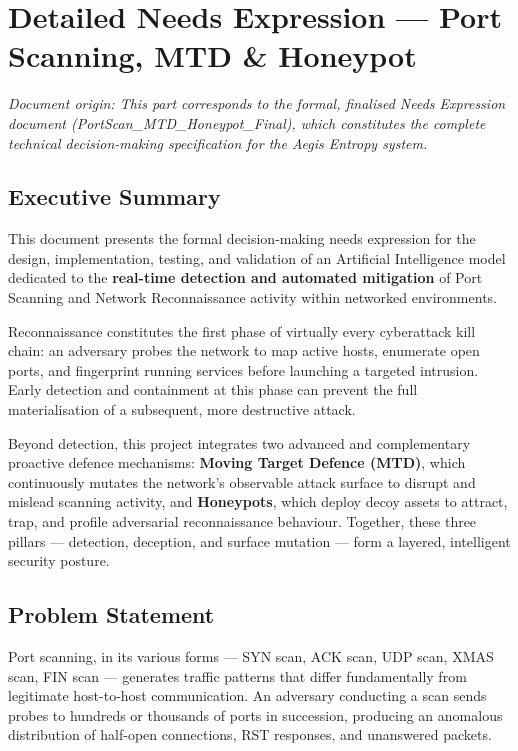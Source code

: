 \documentclass[12pt,a4paper]{report}
\begin{document}
\part{Detailed Needs Expression --- Port Scanning, MTD \& Honeypot}

\textit{Document origin: This part corresponds to the formal, finalised Needs Expression
document (PortScan\_MTD\_Honeypot\_Final), which constitutes the complete technical
decision-making specification for the Aegis Entropy system.}

\chapter{Executive Summary}

This document presents the formal decision-making needs expression for the design,
implementation, testing, and validation of an Artificial Intelligence model dedicated to the
\textbf{real-time detection and automated mitigation} of Port Scanning and Network
Reconnaissance activity within networked environments.

Reconnaissance constitutes the first phase of virtually every cyberattack kill chain: an
adversary probes the network to map active hosts, enumerate open ports, and fingerprint
running services before launching a targeted intrusion. Early detection and containment at
this phase can prevent the full materialisation of a subsequent, more destructive attack.

Beyond detection, this project integrates two advanced and complementary proactive defence
mechanisms: \textbf{Moving Target Defence (MTD)}, which continuously mutates the
network's observable attack surface to disrupt and mislead scanning activity, and
\textbf{Honeypots}, which deploy decoy assets to attract, trap, and profile adversarial
reconnaissance behaviour. Together, these three pillars --- detection, deception, and surface
mutation --- form a layered, intelligent security posture.

\chapter{Problem Statement}

Port scanning, in its various forms --- SYN scan, ACK scan, UDP scan, XMAS scan, FIN scan
--- generates traffic patterns that differ fundamentally from legitimate host-to-host
communication. An adversary conducting a scan sends probes to hundreds or thousands of
ports in succession, producing an anomalous distribution of half-open connections, RST
responses, and unanswered packets.
\end{document}

